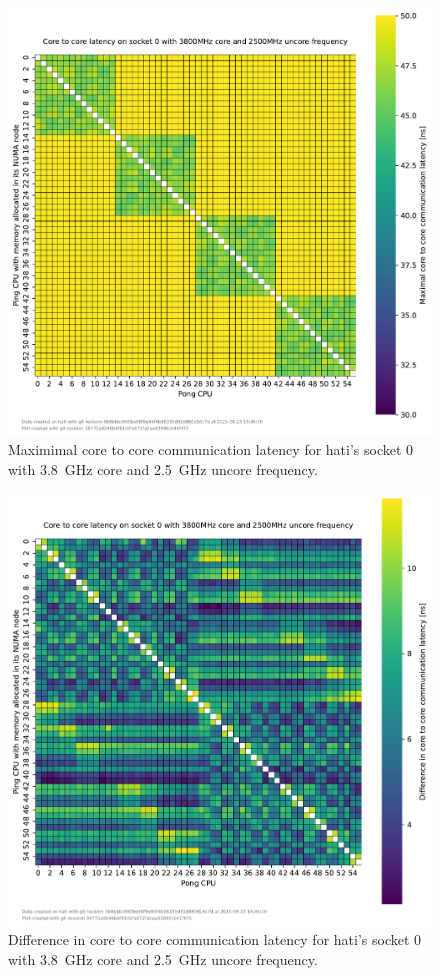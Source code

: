 \begin{figure}[]
    \centering
    \includegraphics[width=\columnwidth]{fig/core-to-core-latency/core-to-core-heatmap-max-3800-2500.pdf}
    \caption{Maximimal core to core communication latency for hati's socket 0 with \SI{3.8}{\GHz} core and \SI{2.5}{\GHz} uncore frequency.}
\end{figure}
\begin{figure}[]
    \centering
    \includegraphics[width=\columnwidth]{fig/core-to-core-latency/core-to-core-heatmap-diff-3800-2500.pdf}
    \caption{Difference in core to core communication latency for hati's socket 0 with \SI{3.8}{\GHz} core and \SI{2.5}{\GHz} uncore frequency.}
\end{figure}

